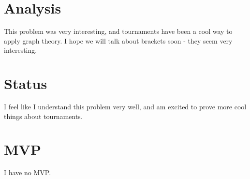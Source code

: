 \documentclass[11pt]{article} %
\begin{document}
\section{Analysis}
This problem was very interesting, and tournaments have been a cool way to apply graph theory. I hope we will talk about brackets soon - they seem very interesting. 
\section{Status}
I feel like I understand this problem very well, and am excited to prove more cool things about tournaments. 
\section{MVP}
I have no MVP.
\end{document}
